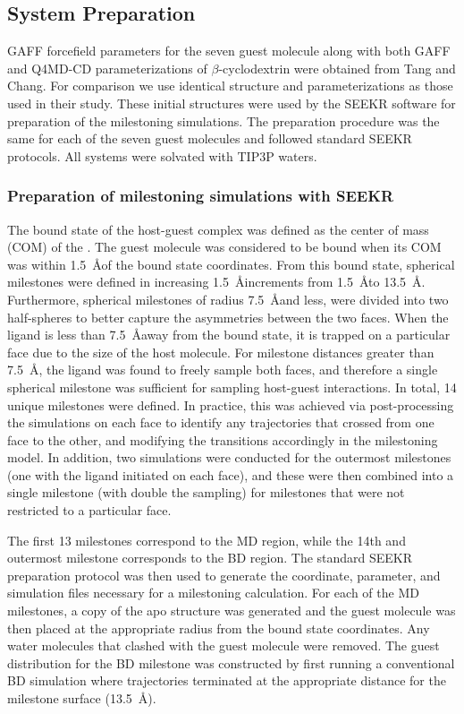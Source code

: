 \subsection*{System Preparation}
\par GAFF\cite{Wang2004,Wang2006} forcefield parameters for the seven guest molecule
along with both GAFF and Q4MD-CD\cite{Cezard2011} parameterizations of $\beta$-cyclodextrin
were obtained from Tang and Chang\cite{Tang2017}. For comparison we use identical structure and
parameterizations as those used in their study. These initial structures were
used by the SEEKR software for preparation of the milestoning simulations.
The preparation procedure was the same for each of the seven guest molecules and
followed standard SEEKR protocols\cite{Votapka2017}. All systems were solvated
with TIP3P waters\cite{Jorgensen1983a}.

\subsubsection*{Preparation of milestoning simulations with SEEKR}
\par The bound state of the host-guest complex was defined as the center of mass (COM)
of the \bcd. The guest molecule was considered to be bound when
its COM was within 1.5~\AA of the bound state coordinates. From this bound state,
spherical milestones were defined in increasing 1.5~\AA increments from 1.5~\AA to
13.5~\AA. Furthermore, spherical milestones of radius 7.5~\AA and less, were
divided into two half-spheres to better capture the asymmetries between the two faces.
When the ligand is less than 7.5~\AA away from the bound state, it is trapped on
a particular face due to the size of the host molecule. For milestone distances
greater than 7.5~\AA, the ligand was found to freely sample both faces, and therefore
a single spherical milestone was sufficient for sampling host-guest interactions.
In total, 14 unique milestones were defined. In practice, this was achieved via
post-processing the simulations on each face to identify any trajectories that
crossed from one face to the other, and modifying the transitions accordingly in
the milestoning model. In addition, two simulations were conducted for the outermost
milestones (one with the ligand initiated on each face), and these were then
combined into a single milestone (with double the sampling) for milestones that
were not restricted to a particular face.


\par The first 13 milestones correspond to the MD region, while the 14th and
outermost milestone corresponds to the BD region. The standard SEEKR preparation
protocol\cite{Votapka2017} was then used to generate the coordinate, parameter,
and simulation files necessary for a milestoning calculation. For each of the MD
milestones, a copy of the apo \bcd structure was generated and the guest
molecule was then placed at the appropriate radius from the bound state coordinates.
Any water molecules that clashed with the guest molecule were removed. The guest
distribution for the BD milestone was constructed by first running a conventional
BD simulation where trajectories terminated at the appropriate distance for the
milestone surface (13.5~\AA).

